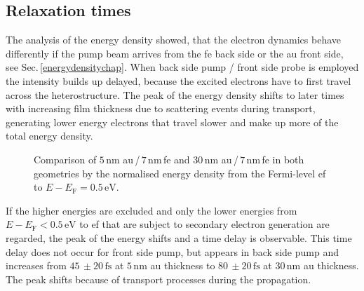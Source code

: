 \documentclass[a4paper,12pt,twoside]{article}
\begin{document}
        \subsection{Relaxation times}
            \label{chapDRT}
The analysis of the energy density showed, that the electron dynamics behave differently if the pump beam arrives from the \gls{fe} back side or the \gls{au} front side, see Sec.\,\ref{energydensitychap}. When back side pump / front side probe is employed the intensity builds up delayed, because the excited electrons have to first travel across the heterostructure. The peak of the energy density shifts to later times with increasing film thickness due to scattering events during transport, generating lower energy electrons that travel slower and make up more of the total energy density. 
		\begin{figure}[H]
		\caption{Comparison of $5\,\mathrm{nm}$ \gls{au}\,/\,$7\,\mathrm{nm}$\,\gls{fe} and $30\,\mathrm{nm}$ \gls{au}\,/\,$7\,\mathrm{nm}$\,\gls{fe} in both geometries by the normalised energy density from the Fermi-level \gls{ef} to $E - E_\mathrm{F} = 0.5\,\mathrm{eV}$.}
    		\label{Vergleich}
	\end{figure}
If the higher energies are excluded and only the lower energies from $E - E_\mathrm{F}<0.5\,\mathrm{eV}$ to \gls{ef} that are subject to secondary electron generation are regarded, the peak of the energy shifts and a time delay is observable. This time delay does not occur for front side pump, but appears in back side pump and increases from $45\,\pm20\,\mathrm{fs}$ at $5\,\mathrm{nm}$ \gls{au} thickness to $80\,\pm20\,\mathrm{fs}$ at $30\,\mathrm{nm}$ \gls{au} thickness. The peak shifts because of transport processes during the propagation.
\end{document}
